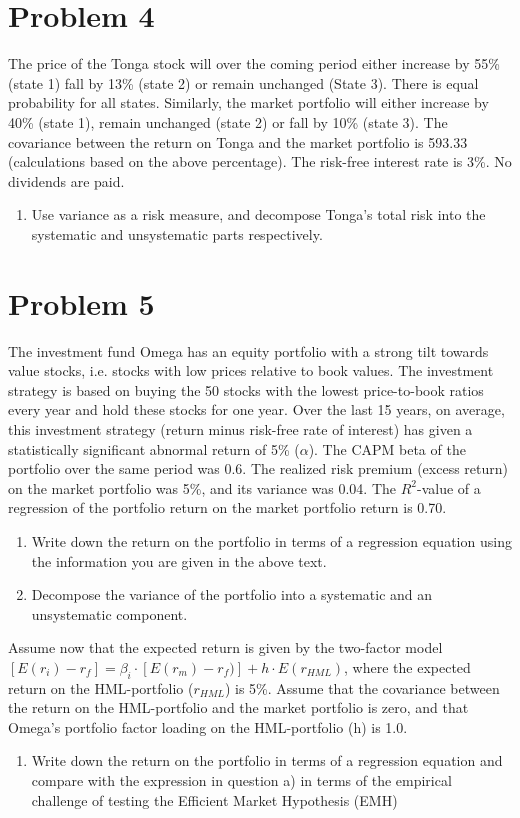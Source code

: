 \documentclass[12]{article}
\begin{document}
\color{black}
\section*{Problem 4}
The price of the Tonga stock will over the coming period either increase by 55\%(state 1) fall by 13\% (state 2) or remain unchanged (State 3). There is equal probability for all states. 
Similarly, the market portfolio will either increase by 40\% (state 1), remain unchanged (state 2) or fall by 10\% (state 3). The covariance between the return on Tonga and the market portfolio is 593.33 (calculations based on the above percentage). The risk-free interest rate is 3\%. No dividends are paid.
\begin{enumerate}
    \item[a)] Use variance as a risk measure, and decompose Tonga's total risk into the systematic and unsystematic parts respectively. 
\end{enumerate}





\color{black}
\section*{Problem 5}
The investment fund Omega has an equity portfolio with a strong tilt towards value stocks, i.e. stocks with low prices relative to book values. The investment strategy is based on buying the 50 stocks with the lowest price-to-book ratios every year and hold these stocks for one year. Over the last 15 years, on average, this investment strategy (return minus risk-free rate of interest) has given a statistically significant abnormal return of 5\% ($\alpha$). The CAPM beta of the portfolio over the same period was 0.6. The realized risk premium (excess return) on the market portfolio was 5\%, and its variance was 0.04. The $R^2$-value of a regression of the portfolio return on the market portfolio return is 0.70.
\begin{enumerate}
    \item[a)] Write down the return on the portfolio in terms of a regression equation using the information you are given in the above text.
    \item[b)] Decompose the variance of the portfolio into a systematic and an unsystematic component.
\end{enumerate}
\noindent
Assume now that the expected return is given by the two-factor model $[E(r_i) - r_f] = \beta_i\cdot[E(r_m) - r_f)] + h\cdot E(r_{HML})$, where the expected return on the HML-portfolio ($r_{HML}$) is 5\%. Assume that the covariance between the return on the HML-portfolio and the market portfolio is zero, and that Omega’s portfolio factor loading on the HML-portfolio (h) is 1.0.
\begin{enumerate}
    \item[c)] Write down the return on the portfolio in terms of a regression equation and compare with the expression in question a) in terms of the empirical challenge of testing the Efficient Market Hypothesis (EMH)
\end{enumerate}
\end{document}
